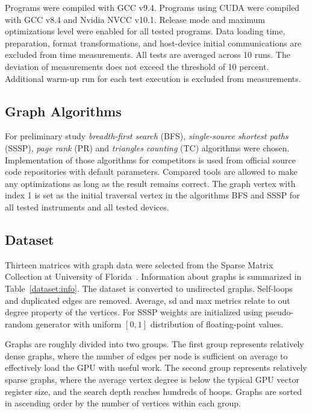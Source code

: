 Programs were compiled with GCC v9.4. Programs using CUDA were compiled with GCC v8.4 and Nvidia NVCC v10.1.
Release mode and maximum optimizations level were enabled for all tested programs. 
Data loading time, preparation, format transformations, and host-device initial communications are excluded from time measurements. 
All tests are averaged across 10 runs. The deviation of measurements does not exceed the threshold of 10 percent. Additional warm-up run for each test execution is excluded from measurements.

\subsection{Graph Algorithms}

For preliminary study \textit{breadth-first search} (BFS), \textit{single-source shortest paths} (SSSP), \textit{page rank} (PR) and \textit{triangles counting} (TC) algorithms were chosen.
Implementation of those algorithms for competitors is used from official source code repositories with default parameters. Compared tools are allowed to make any optimizations as long as the result remains correct.
The graph vertex with index 1 is set as the initial traversal vertex in the algorithms BFS and SSSP for all tested instruments and all tested devices.

\subsection{Dataset}

Thirteen matrices with graph data were selected from the Sparse Matrix Collection at University of Florida~\cite{dataset:10.1145/2049662.2049663}. 
Information about graphs is summarized in Table~\ref{dataset:info}. 
The dataset is converted to undirected graphs. 
Self-loops and duplicated edges are removed. 
Average, sd and max metrics relate to out degree property of the vertices.
For SSSP weights are initialized using pseudo-random generator with uniform $[0, 1]$ distribution of floating-point values.

Graphs are roughly divided into two groups. 
The first group represents relatively dense graphs, where the number of edges per node is sufficient on average to effectively load the GPU with useful work. 
The second group represents relatively sparse graphs, where the average vertex degree is below the typical GPU vector register size, and the search depth reaches hundreds of hoops. 
Graphs are sorted in ascending order by the number of vertices within each group.

